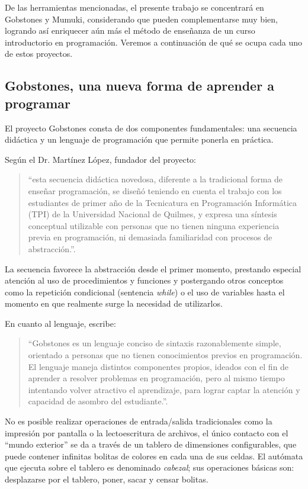 De las herramientas mencionadas, el presente trabajo se concentrará en Gobstones y Mumuki, considerando que pueden complementarse muy bien, logrando así enriquecer aún más el método de enseñanza de un curso introductorio en programación. Veremos a continuación de qué se ocupa cada uno de estos proyectos.

\subsection{Gobstones, una nueva forma de aprender a programar}
El proyecto Gobstones consta de dos componentes fundamentales: una secuencia didáctica y un lenguaje de programación que permite ponerla en práctica.

Según el Dr. Martínez López, fundador del proyecto:

\begin{quote}
``esta secuencia didáctica novedosa, diferente a la tradicional forma de enseñar programación, se diseñó teniendo en cuenta el trabajo con los estudiantes de primer año de la Tecnicatura en Programación Informática (TPI) de la Universidad Nacional de Quilmes, y expresa una síntesis conceptual utilizable con personas que no tienen ninguna experiencia previa en programación, ni demasiada familiaridad con procesos de abstracción.''\cite{LibroGobstones}.
\end{quote}

La secuencia favorece la abstracción desde el primer momento, prestando especial atención al uso de procedimientos y funciones y postergando otros conceptos como la repetición condicional (sentencia \textit{while}) o el uso de variables hasta el momento en que realmente surge la necesidad de utilizarlos.

En cuanto al lenguaje, escribe:

\begin{quote}
``Gobstones es un lenguaje conciso de sintaxis razonablemente simple, orientado a personas que no tienen conocimientos previos en programación. El lenguaje maneja distintos componentes propios, ideados con el fin de aprender a resolver problemas en programación, pero al mismo tiempo intentando volver atractivo el aprendizaje, para lograr captar la atención y capacidad de asombro del estudiante.''\cite{LibroGobstones}.
\end{quote}

No es posible realizar operaciones de entrada/salida tradicionales como la impresión por pantalla o la lectoescritura de archivos, el único contacto con el ``mundo exterior'' se da a través de un tablero de dimensiones configurables, que puede contener infinitas bolitas de colores en cada una de sus celdas. El autómata que ejecuta sobre el tablero es denominado \textit{cabezal}; sus operaciones básicas son: desplazarse por el tablero, poner, sacar y censar bolitas.

